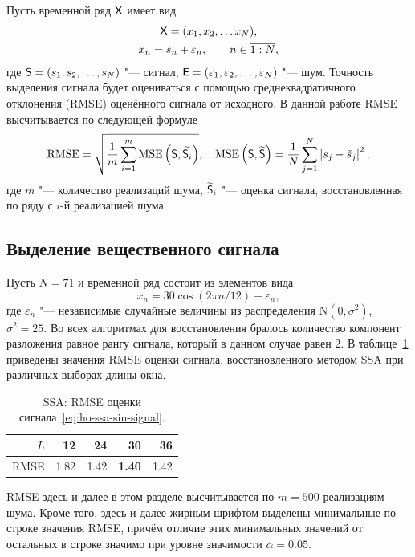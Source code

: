 \documentclass[specialist,
  substylefile=spbu_report.rtx,
subf,href,colorlinks=true, 12pt]{disser}
\theoremstyle{plain}
\theoremstyle{definition}
\theoremstyle{remark}
\begin{document}
Пусть временной ряд $\mathsf{X}$ имеет вид
\begin{gather*}
  \mathsf{X} = (x_1, x_2,\ldots x_{N}), \\
  x_n = s_n + \varepsilon_n, \qquad n\in \overline{1:N},
\end{gather*}
где $\mathsf{S} = (s_1, s_2, \ldots, s_N)$ "--- сигнал,
$\mathsf{E} = (\varepsilon_1, \varepsilon_2, \ldots, \varepsilon_N)$ "--- шум.
Точность выделения сигнала будет оцениваться с помощью
среднеквадратичного отклонения (RMSE)
оценённого сигнала от исходного.
В данной работе RMSE высчитывается по следующей формуле
\begin{equation*}
  \text{RMSE} = \sqrt{\frac{1}{m} \sum_{i=1}^{m} \text{MSE}\left(\mathsf{S},
  \widetilde{\mathsf{S}_i}\right)},
  \quad \text{MSE}\left(\mathsf{S}, \widetilde{\mathsf{S}} \right) = \frac{1}{N}
  \sum_{j=1}^{N}\left|s_j - \tilde{s}_j\right|^2,
\end{equation*}
где $m$ "--- количество реализаций шума, $\widetilde{\mathsf{S}}_i$ "---
оценка сигнала,
восстановленная по ряду с $i$-й реализацией шума.

\subsection{Выделение вещественного сигнала}\label{subsec:comparison}
Пусть $N = 71$ и временной ряд состоит из элементов вида
\begin{equation}
  \label{eq:ho-ssa-sin-signal}
  x_n = 30\cos(2\pi n/12) + \varepsilon_n,
\end{equation}
где $\varepsilon_n$ "--- независимые случайные величины из
распределения $\mathrm{N}(0, \sigma^2)$,
$\sigma^2=25$.
Во всех алгоритмах для восстановления бралось количество компонент
разложения равное рангу сигнала,
который в данном случае равен 2.
В таблице~\ref{tab:ssa-cos} приведены значения RMSE оценки сигнала,
восстановленного
методом SSA при различных выборах длины окна.
\begin{table}[!ht]
  \centering
  \caption{SSA: RMSE оценки сигнала~\eqref{eq:ho-ssa-sin-signal}.}
  \begin{tabular}{r|r|r|r|r}
    \hline
    $L$ &   12 &   24 &            30 &   36 \\ \hline
    RMSE & 1.82 & 1.42 & \textbf{1.40} & 1.42 \\ \hline
  \end{tabular}\label{tab:ssa-cos}
\end{table}
RMSE здесь и далее в этом разделе высчитывается по $m=500$ реализациям шума.
Кроме того, здесь и далее жирным шрифтом выделены минимальные по
строке значения RMSE, причём
отличие этих минимальных значений от остальных в строке значимо при
уровне значимости $\alpha = 0.05$.
\end{document}
